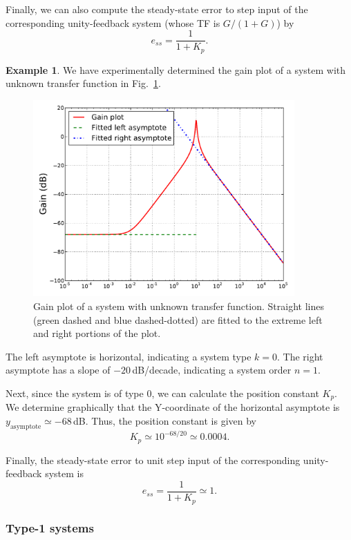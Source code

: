 \documentclass[a4paper,11pt]{report}
\theoremstyle{definition}
\newtheorem{mdexample}{Example}
\newenvironment{example}%
  {\vspace{0.1cm}\begin{mdframed}[backgroundcolor=lightgray]\begin{mdexample}}%
  {\end{mdexample}\end{mdframed}\vspace{0.1cm}}
\begin{document}
Finally, we can also compute the steady-state error to step input of
the corresponding unity-feedback system (whose TF is $G/(1+G)$) by
\[
e_{ss} = \frac{1}{1+K_p}.
\]

\begin{example}
  \label{ex:bode-type0}
  We have experimentally determined the gain plot of a system with
  unknown transfer function in Fig.~\ref{fig:bode-type0}.
  \begin{figure}[H]
    \centering
    \includegraphics[width=10cm]{fig/bode-type0.pdf}
    \caption{Gain plot of a system with unknown transfer
      function. Straight lines (green dashed and blue dashed-dotted)
      are fitted to the extreme left and right portions of the plot.}
    \label{fig:bode-type0}
  \end{figure}

  The left asymptote is horizontal, indicating a system type
  $k=0$. The right asymptote has a slope of $-20$\,dB/decade,
  indicating a system order $n=1$.

  Next, since the system is of type 0, we can calculate the position
  constant $K_p$. We determine graphically that the Y-coordinate of
  the horizontal asymptote is $y_\mathrm{asymptote}\simeq
  -68$\,dB. Thus, the position constant is given by
  \[
  K_p \simeq 10^{-68/20}  \simeq 0.0004.
  \]

  Finally, the steady-state error to unit step input of the
  corresponding unity-feedback system is
  \[
  e_{ss} = \frac{1}{1+K_p} \simeq 1.
  \]


\end{example}

\subsubsection{Type-1 systems}
\end{document}
